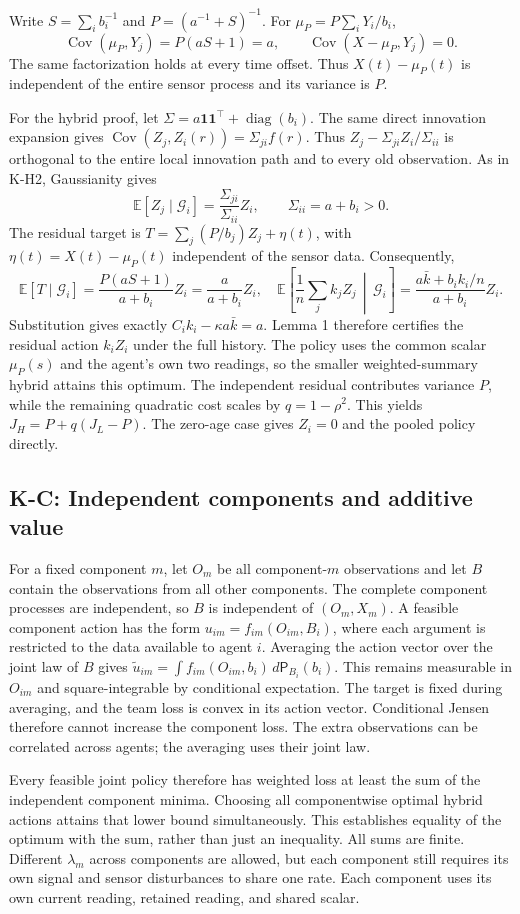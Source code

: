 \documentclass[11pt,letterpaper]{article}
\newcommand{\E}{\mathbb E}
\newcommand{\Cov}{\operatorname{Cov}}
\newcommand{\one}{\mathbf1}
\newcommand{\G}{\mathcal G}
\newcommand{\calculation}[2]{\subsection{#1: #2}}
\begin{document}
Write $S=\sum_i b_i^{-1}$ and $P=(a^{-1}+S)^{-1}$. For $\mu_P=P\sum_iY_i/b_i$,
\[
\Cov(\mu_P,Y_j)=P(aS+1)=a,
\qquad
\Cov(X-\mu_P,Y_j)=0.
\]
The same factorization holds at every time offset. Thus $X(t)-\mu_P(t)$ is independent of the entire sensor process and its variance is $P$.

For the hybrid proof, let $\Sigma=a\one\one^\top+\operatorname{diag}(b_i)$. The same direct innovation expansion gives $\Cov(Z_j,Z_i(r))=\Sigma_{ji}f(r)$. Thus $Z_j-\Sigma_{ji}Z_i/\Sigma_{ii}$ is orthogonal to the entire local innovation path and to every old observation. As in K-H2, Gaussianity gives
\[
\E[Z_j\mid\G_i]=\frac{\Sigma_{ji}}{\Sigma_{ii}}Z_i,
\qquad \Sigma_{ii}=a+b_i>0.
\]
The residual target is $T=\sum_j(P/b_j)Z_j+\eta(t)$, with $\eta(t)=X(t)-\mu_P(t)$ independent of the sensor data. Consequently,
\[
\E[T\mid\G_i]=\frac{P(aS+1)}{a+b_i}Z_i=\frac{a}{a+b_i}Z_i,
\quad
\E\left[\frac1n\sum_j k_jZ_j\,\middle|\,\G_i\right]
=\frac{a\bar k+b_i k_i/n}{a+b_i}Z_i.
\]
Substitution gives exactly $C_i k_i-\kappa a\bar k=a$. Lemma 1 therefore certifies the residual action $k_iZ_i$ under the full history. The policy uses the common scalar $\mu_P(s)$ and the agent's own two readings, so the smaller weighted-summary hybrid attains this optimum. The independent residual contributes variance $P$, while the remaining quadratic cost scales by $q=1-\rho^2$. This yields $J_H=P+q(J_L-P)$. The zero-age case gives $Z_i=0$ and the pooled policy directly.

\calculation{K-C}{Independent components and additive value}
For a fixed component $m$, let $O_m$ be all component-$m$ observations and let $B$ contain the observations from all other components. The complete component processes are independent, so $B$ is independent of $(O_m,X_m)$. A feasible component action has the form $u_{im}=f_{im}(O_{im},B_i)$, where each argument is restricted to the data available to agent $i$. Averaging the action vector over the joint law of $B$ gives $\widetilde u_{im}=\int f_{im}(O_{im},b_i)\,d\mathsf P_{B_i}(b_i)$. This remains measurable in $O_{im}$ and square-integrable by conditional expectation. The target is fixed during averaging, and the team loss is convex in its action vector. Conditional Jensen therefore cannot increase the component loss. The extra observations can be correlated across agents; the averaging uses their joint law.

Every feasible joint policy therefore has weighted loss at least the sum of the independent component minima. Choosing all componentwise optimal hybrid actions attains that lower bound simultaneously. This establishes equality of the optimum with the sum, rather than just an inequality. All sums are finite. Different $\lambda_m$ across components are allowed, but each component still requires its own signal and sensor disturbances to share one rate. Each component uses its own current reading, retained reading, and shared scalar.
\end{document}
